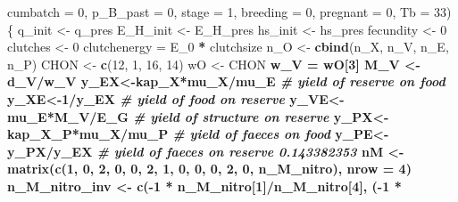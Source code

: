 \documentclass[]{article}
\newenvironment{Shaded}{\begin{snugshade}}{\end{snugshade}}
\newcommand{\KeywordTok}[1]{\textcolor[rgb]{0.13,0.29,0.53}{\textbf{#1}}}
\newcommand{\DataTypeTok}[1]{\textcolor[rgb]{0.13,0.29,0.53}{#1}}
\newcommand{\DecValTok}[1]{\textcolor[rgb]{0.00,0.00,0.81}{#1}}
\newcommand{\StringTok}[1]{\textcolor[rgb]{0.31,0.60,0.02}{#1}}
\newcommand{\CommentTok}[1]{\textcolor[rgb]{0.56,0.35,0.01}{\textit{#1}}}
\newcommand{\OperatorTok}[1]{\textcolor[rgb]{0.81,0.36,0.00}{\textbf{#1}}}
\newcommand{\NormalTok}[1]{#1}
\begin{document}
\begin{Shaded}
\begin{Highlighting}[]
    \DataTypeTok{cumbatch =} \DecValTok{0}\NormalTok{, }\DataTypeTok{p_B_past =} \DecValTok{0}\NormalTok{, }\DataTypeTok{stage =} \DecValTok{1}\NormalTok{, }\DataTypeTok{breeding =} \DecValTok{0}\NormalTok{, }\DataTypeTok{pregnant =} \DecValTok{0}\NormalTok{, }
    \DataTypeTok{Tb =} \DecValTok{33}\NormalTok{) }
\NormalTok{\{}
\NormalTok{    q_init <-}\StringTok{ }\NormalTok{q_pres}
\NormalTok{    E_H_init <-}\StringTok{ }\NormalTok{E_H_pres}
\NormalTok{    hs_init <-}\StringTok{ }\NormalTok{hs_pres}
\NormalTok{    fecundity <-}\StringTok{ }\DecValTok{0}
\NormalTok{    clutches <-}\StringTok{ }\DecValTok{0}
\NormalTok{    clutchenergy =}\StringTok{ }\NormalTok{E_}\DecValTok{0} \OperatorTok{*}\StringTok{ }\NormalTok{clutchsize}
\NormalTok{    n_O <-}\StringTok{ }\KeywordTok{cbind}\NormalTok{(n_X, n_V, n_E, n_P)}
\NormalTok{    CHON <-}\StringTok{ }\KeywordTok{c}\NormalTok{(}\DecValTok{12}\NormalTok{, }\DecValTok{1}\NormalTok{, }\DecValTok{16}\NormalTok{, }\DecValTok{14}\NormalTok{)}
\NormalTok{    wO <-}\StringTok{ }\NormalTok{CHON }\OperatorTok{%*%}\StringTok{ }\NormalTok{n_O}
\NormalTok{    w_V =}\StringTok{ }\NormalTok{wO[}\DecValTok{3}\NormalTok{]}
\NormalTok{    M_V <-}\StringTok{ }\NormalTok{d_V}\OperatorTok{/}\NormalTok{w_V}
\NormalTok{    y_EX<-kap_X}\OperatorTok{*}\NormalTok{mu_X}\OperatorTok{/}\NormalTok{mu_E }\CommentTok{# yield of reserve on food}
\NormalTok{    y_XE<-}\DecValTok{1}\OperatorTok{/}\NormalTok{y_EX }\CommentTok{# yield of food on reserve}
\NormalTok{    y_VE<-mu_E}\OperatorTok{*}\NormalTok{M_V}\OperatorTok{/}\NormalTok{E_G  }\CommentTok{# yield of structure on reserve}
\NormalTok{    y_PX<-kap_X_P}\OperatorTok{*}\NormalTok{mu_X}\OperatorTok{/}\NormalTok{mu_P }\CommentTok{# yield of faeces on food}
\NormalTok{    y_PE<-y_PX}\OperatorTok{/}\NormalTok{y_EX }\CommentTok{# yield of faeces on reserve  0.143382353}
\NormalTok{    nM <-}\StringTok{ }\KeywordTok{matrix}\NormalTok{(}\KeywordTok{c}\NormalTok{(}\DecValTok{1}\NormalTok{, }\DecValTok{0}\NormalTok{, }\DecValTok{2}\NormalTok{, }\DecValTok{0}\NormalTok{, }\DecValTok{0}\NormalTok{, }\DecValTok{2}\NormalTok{, }\DecValTok{1}\NormalTok{, }\DecValTok{0}\NormalTok{, }\DecValTok{0}\NormalTok{, }\DecValTok{0}\NormalTok{, }\DecValTok{2}\NormalTok{, }\DecValTok{0}\NormalTok{, n_M_nitro), }
        \DataTypeTok{nrow =} \DecValTok{4}\NormalTok{)}
\NormalTok{    n_M_nitro_inv <-}\StringTok{ }\KeywordTok{c}\NormalTok{(}\OperatorTok{-}\DecValTok{1} \OperatorTok{*}\StringTok{ }\NormalTok{n_M_nitro[}\DecValTok{1}\NormalTok{]}\OperatorTok{/}\NormalTok{n_M_nitro[}\DecValTok{4}\NormalTok{], (}\OperatorTok{-}\DecValTok{1} \OperatorTok{*}\StringTok{ }
}
\end{Highlighting}
\end{Shaded}
\end{document}
